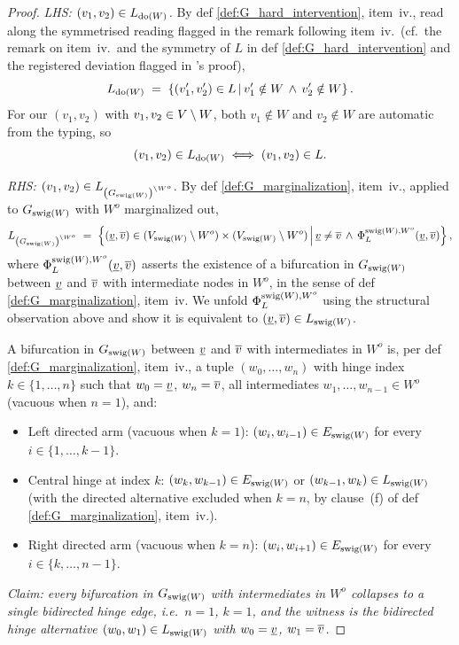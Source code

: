 \documentclass[main]{subfiles}
\begin{document}
\begin{proof}
\smallskip\noindent\emph{LHS: $(v_1, v_2) \in L_{\operatorname{do}(W)}$.} By def \ref{def:G_hard_intervention}, item~iv., read along the symmetrised reading flagged in the remark following item~iv.\ (cf.\ the remark on item~iv.\ and the symmetry of $L$ in def \ref{def:G_hard_intervention} and the registered deviation flagged in 's proof),
\[
    L_{\operatorname{do}(W)} \;=\; \left \{ (v_1', v_2') \in L \,\middle|\, v_1' \notin W \,\wedge\, v_2' \notin W \right \}.
\]
For our $(v_1, v_2)$ with $v_1, v_2 \in V \setminus W$, both $v_1 \notin W$ and $v_2 \notin W$ are automatic from the typing, so
\[
    (v_1, v_2) \in L_{\operatorname{do}(W)} \;\Longleftrightarrow\; (v_1, v_2) \in L.
\]

\smallskip\noindent\emph{RHS: $(v_1, v_2) \in L_{\left ( G_{\mathrm{swig}(W)} \right )^{\setminus W^o}}$.} By def \ref{def:G_marginalization}, item~iv., applied to $G_{\mathrm{swig}(W)}$ with $W^o$ marginalized out,
\[
    L_{\left ( G_{\mathrm{swig}(W)} \right )^{\setminus W^o}} \;=\; \left \{ (\underline{v}, \overline{v}) \in (V_{\mathrm{swig}(W)} \setminus W^o) \times (V_{\mathrm{swig}(W)} \setminus W^o) \,\middle|\, \underline{v} \neq \overline{v} \,\wedge\, \Phi_L^{\mathrm{swig}(W), W^o}(\underline{v}, \overline{v}) \right \},
\]
where $\Phi_L^{\mathrm{swig}(W), W^o}(\underline{v}, \overline{v})$ asserts the existence of a bifurcation in $G_{\mathrm{swig}(W)}$ between $\underline{v}$ and $\overline{v}$ with intermediate nodes in $W^o$, in the sense of def \ref{def:G_marginalization}, item~iv. We unfold $\Phi_L^{\mathrm{swig}(W), W^o}$ using the structural observation above and show it is equivalent to $(\underline{v}, \overline{v}) \in L_{\mathrm{swig}(W)}$.

A bifurcation in $G_{\mathrm{swig}(W)}$ between $\underline{v}$ and $\overline{v}$ with intermediates in $W^o$ is, per def \ref{def:G_marginalization}, item~iv., a tuple $(w_0, \ldots, w_n)$ with hinge index $k \in \{1, \ldots, n\}$ such that $w_0 = \underline{v}$, $w_n = \overline{v}$, all intermediates $w_1, \ldots, w_{n-1} \in W^o$ (vacuous when $n = 1$), and:
\begin{itemize}
    \item Left directed arm (vacuous when $k = 1$): $(w_i, w_{i-1}) \in E_{\mathrm{swig}(W)}$ for every $i \in \{1, \ldots, k-1\}$.
    \item Central hinge at index $k$: $(w_k, w_{k-1}) \in E_{\mathrm{swig}(W)}$ or $(w_{k-1}, w_k) \in L_{\mathrm{swig}(W)}$ (with the directed alternative excluded when $k = n$, by clause~(f) of def \ref{def:G_marginalization}, item~iv.).
    \item Right directed arm (vacuous when $k = n$): $(w_i, w_{i+1}) \in E_{\mathrm{swig}(W)}$ for every $i \in \{k, \ldots, n-1\}$.
\end{itemize}

\emph{Claim: every bifurcation in $G_{\mathrm{swig}(W)}$ with intermediates in $W^o$ collapses to a single bidirected hinge edge, i.e.\ $n = 1$, $k = 1$, and the witness is the bidirected hinge alternative $(w_0, w_1) \in L_{\mathrm{swig}(W)}$ with $w_0 = \underline{v}$, $w_1 = \overline{v}$.}


\end{proof}
\end{document}
